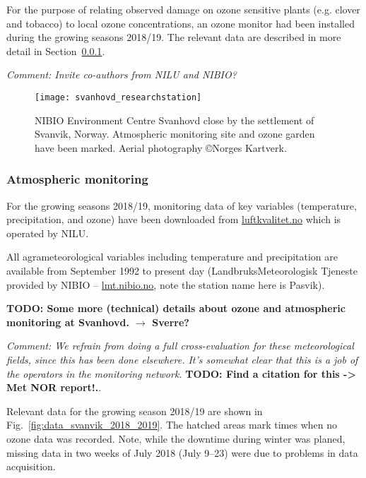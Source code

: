 \documentclass[bg, manuscript]{copernicus}
\begin{document}
For the purpose of relating observed damage on ozone sensitive plants (e.g. clover and tobacco) to local ozone concentrations, an ozone monitor had been installed during the growing seasons 2018/19. The relevant data are described in more detail in Section~\ref{subsubsec:atmo_svanvik}.

\emph{Comment: Invite co-authors from NILU and NIBIO?}

\begin{figure}[t]
  \texttt{[image: svanhovd\_researchstation]}
  \caption{NIBIO Environment Centre Svanhovd close by the settlement of Svanvik, Norway. Atmospheric monitoring site and ozone garden have been marked. Aerial photography \copyright Norges Kartverk.}
  \label{fig:svanhovd_research_station}
\end{figure}


\subsubsection{Atmospheric monitoring}
\label{subsubsec:atmo_svanvik}
For the growing seasons 2018/19, monitoring data of key variables (temperature, precipitation, and ozone) have been downloaded from \href{luftkvalitet.no}{luftkvalitet.no} which is operated by NILU.

All agrameteorological variables including temperature and precipitation are available from September 1992 to present day (LandbruksMeteorologisk Tjeneste provided by NIBIO -- \href{https://lmt.nibio.no/}{lmt.nibio.no}, note the station name here is Pasvik).

{\bf TODO: Some more (technical) details about ozone and atmospheric monitoring at Svanhovd. $\rightarrow$ Sverre?}

\emph{Comment: We refrain from doing a full cross-evaluation for these meteorological fields, since this has been done elsewhere. It's somewhat clear that this is a job of the operators in the monitoring network.} {\bf TODO: Find a citation for this -> Met NOR report!.}.

Relevant data for the growing season 2018/19 are shown in Fig.~\ref{fig:data_svanvik_2018_2019}. The hatched areas mark times when no ozone data was recorded. Note, while the downtime during winter was planed, missing data in two weeks of July 2018 (July 9--23) were due to problems in data acquisition.
\end{document}
